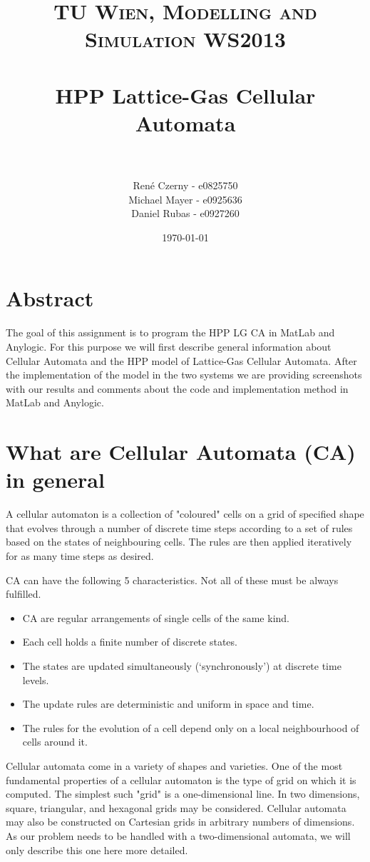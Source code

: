 \documentclass[paper=a4, fontsize=11pt]{scrartcl} %
\title{	
\normalfont \normalsize 
\textsc{TU Wien, Modelling and Simulation WS2013} \\ [25pt] %
\horrule{0.5pt} \\[0.4cm] %
\huge HPP Lattice-Gas Cellular Automata \\ %
\horrule{2pt} \\[0.5cm] %
}
\author{René Czerny - e0825750\\Michael Mayer - e0925636\\Daniel Rubas - e0927260}
\date{\normalsize\today} %
\numberwithin{equation}{section} %
\numberwithin{figure}{section} %
\numberwithin{table}{section} %
\begin{document}
\maketitle %

\section{Abstract}

The goal of this assignment is to program the HPP LG CA in MatLab and Anylogic. For this purpose we will first describe general information about Cellular Automata and the HPP model of Lattice-Gas Cellular Automata. After the implementation of the model in the two systems we are providing screenshots with our results and comments about the code and implementation method in MatLab and Anylogic.

\section{What are Cellular Automata (CA) in general}

A cellular automaton is a collection of "coloured" cells on a grid of specified shape that evolves through a number of discrete time steps according to a set of rules based on the states of neighbouring cells. The rules are then applied iteratively for as many time steps as desired.

CA  can have the following 5 characteristics. Not all of these must be always fulfilled. 

\begin{itemize}
	\item CA are regular arrangements of single cells of the same kind.
	\item Each cell holds a finite number of discrete states.
	\item The states are updated simultaneously (`synchronously') at discrete time levels.
	\item The update rules are deterministic and uniform in space and time.
	\item The rules for the evolution of a cell depend only on a local neighbourhood of cells around it. 
\end{itemize}

Cellular automata come in a variety of shapes and varieties. One of the most fundamental properties of a cellular automaton is the type of grid on which it is computed. The simplest such "grid" is a one-dimensional line. In two dimensions, square, triangular, and hexagonal grids may be considered. Cellular automata may also be constructed on Cartesian grids in arbitrary numbers of dimensions. 
As our problem needs to be handled with a two-dimensional automata, we will only describe this one here more detailed. 
\end{document}

